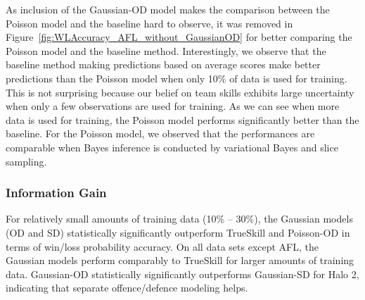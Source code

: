 As inclusion of the Gaussian-OD model makes the comparison between the Poisson model and the baseline hard to observe, it was removed in Figure~\ref{fig:WLAccuracy_AFL_without_GaussianOD} for better comparing the Poisson model and the baseline method. Interestingly, we observe that the baseline method making predictions based on average scores make better predictions than the Poisson model when only 10\% of data is used for training. This is not surprising because our belief on team skills exhibits large uncertainty when only a few observations are used for training. As we can see when more data is used for training, the Poisson model performs significantly better than the baseline. For the Poisson model, we observed that the performances are comparable when Bayes inference is conducted by variational Bayes and slice sampling.
\begin{center}
\begin{figure*}[t!]
 \centering
\caption{\small Results on the AFL data set, evaluated using win/loss prediction accuracy in
term of the area of the curve (AUC). Error bars indicate
95\% confidence intervals.}
\label{fig:WLAccuracy_AFL_without_GaussianOD}
\end{figure*}
\end{center}


\subsubsection{Information Gain}

For relatively small amounts of training data (10\% -- 30\%), the
Gaussian models (OD and SD) statistically significantly outperform
TrueSkill and Poisson-OD in terms of win/loss probability accuracy.
On all data sets except AFL, the Gaussian models perform comparably to
TrueSkill for larger amounts of training data.  Gaussian-OD
statistically significantly outperforms Gaussian-SD for Halo 2,
indicating that separate offence/defence modeling helps.


